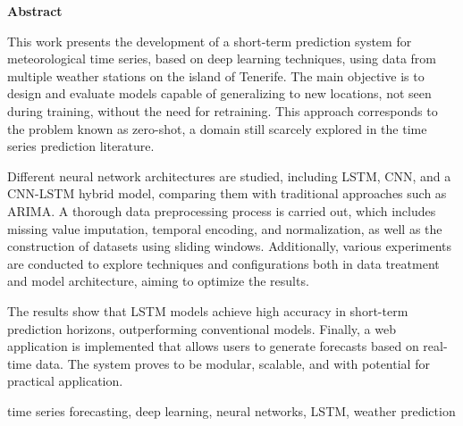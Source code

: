 \documentclass[spanish,a4paper,12pt,oneside]{extreport}
\newenvironment{summary}
{\par\noindent\begin{center}\textbf{Abstract}\end{center}\begin{itshape}\par\noindent}
{\end{itshape}}
\newenvironment{keywords}
{\begin{list}{}{\setlength{\leftmargin}{1em}}\item[\hskip\labelsep \bfseries Keywords:]}
{\end{list}}
\begin{document}
\begin{summary}
{
This work presents the development of a short-term prediction system for meteorological time series, based on deep learning techniques, using data from multiple weather stations on the island of Tenerife. The main objective is to design and evaluate models capable of generalizing to new locations, not seen during training, without the need for retraining. This approach corresponds to the problem known as zero-shot, a domain still scarcely explored in the time series prediction literature.

Different neural network architectures are studied, including LSTM, CNN, and a CNN-LSTM hybrid model, comparing them with traditional approaches such as ARIMA. A thorough data preprocessing process is carried out, which includes missing value imputation, temporal encoding, and normalization, as well as the construction of datasets using sliding windows. Additionally, various experiments are conducted to explore techniques and configurations both in data treatment and model architecture, aiming to optimize the results.

The results show that LSTM models achieve high accuracy in short-term prediction horizons, outperforming conventional models. Finally, a web application is implemented that allows users to generate forecasts based on real-time data. The system proves to be modular, scalable, and with potential for practical application.
}

\em
\begin {keywords}
time series forecasting, deep learning, neural networks, LSTM, weather prediction
\end {keywords}

\end{summary}
\newpage{\pagestyle{empty}}
\thispagestyle{empty}

\pagestyle{myheadings} %



\renewcommand{\thepage}{\roman{page}}
\setcounter{page}{1}
\pagestyle{plain} 
\end{document}
